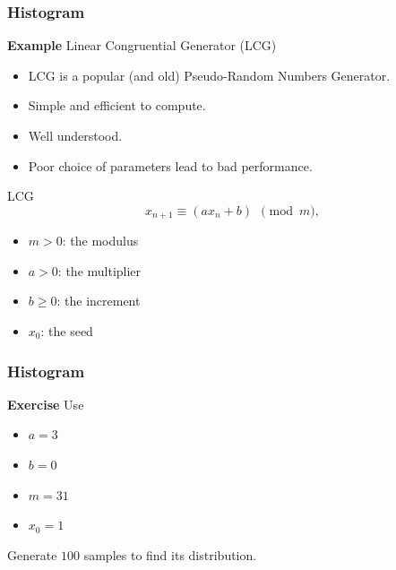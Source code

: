 \documentclass[compress]{beamer}  %
\begin{document}
\begin{frame}[fragile]
\frametitle{Histogram}
\textbf{Example} 
Linear Congruential Generator (LCG)

\begin{itemize}[<+->]
    \item LCG is a popular (and old) Pseudo-Random Numbers Generator.
    \item Simple and efficient to compute.
    \item Well understood.
    \item Poor choice of parameters lead to bad performance.
\end{itemize}
\pause
\begin{block}{LCG}
\begin{equation}
    x_{n+1} \equiv \left( a x_n + b \right)~~\pmod{m},
\end{equation}
\begin{itemize}
    \item $m > 0$: the modulus
    \item $a > 0$: the multiplier
    \item $b \geq 0$: the increment
    \item $x_0$: the seed
\end{itemize}
\end{block}

\end{frame}
\begin{frame}[fragile]
\frametitle{Histogram}
\textbf{Exercise} 
Use
\begin{itemize}
    \item $a = 3$
    \item $b = 0$
    \item $m = 31$
    \item $x_0 = 1$
\end{itemize}
Generate $100$ samples to find its distribution.
\setcounter{subfigure}{0}
\begin{figure}
    \centering
\end{figure}

\end{frame}
\end{document}
